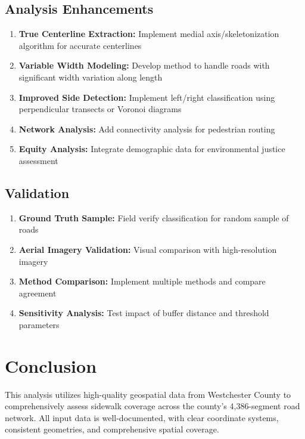 \documentclass[11pt,letterpaper]{article}
\begin{document}
\subsection{Analysis Enhancements}

\begin{enumerate}
    \item \textbf{True Centerline Extraction:} Implement medial axis/skeletonization algorithm for accurate centerlines
    \item \textbf{Variable Width Modeling:} Develop method to handle roads with significant width variation along length
    \item \textbf{Improved Side Detection:} Implement left/right classification using perpendicular transects or Voronoi diagrams
    \item \textbf{Network Analysis:} Add connectivity analysis for pedestrian routing
    \item \textbf{Equity Analysis:} Integrate demographic data for environmental justice assessment
\end{enumerate}

\subsection{Validation}

\begin{enumerate}
    \item \textbf{Ground Truth Sample:} Field verify classification for random sample of roads
    \item \textbf{Aerial Imagery Validation:} Visual comparison with high-resolution imagery
    \item \textbf{Method Comparison:} Implement multiple methods and compare agreement
    \item \textbf{Sensitivity Analysis:} Test impact of buffer distance and threshold parameters
\end{enumerate}

\section{Conclusion}

This analysis utilizes high-quality geospatial data from Westchester County to comprehensively assess sidewalk coverage across the county's 4,386-segment road network. All input data is well-documented, with clear coordinate systems, consistent geometries, and comprehensive spatial coverage.
\end{document}
